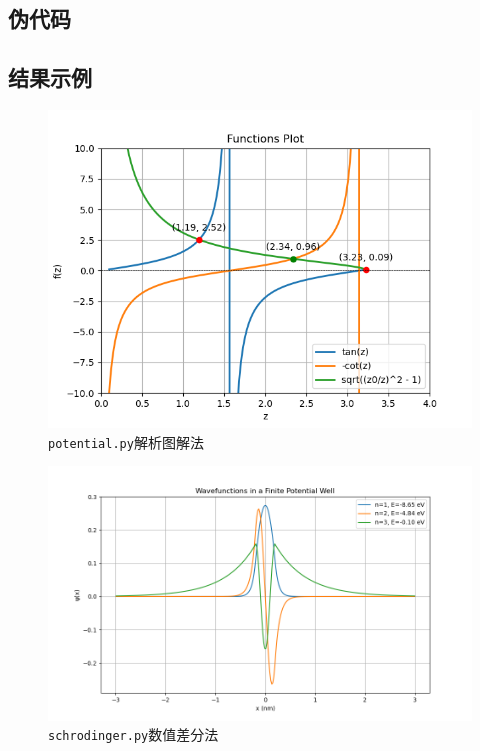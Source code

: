 \subsection{伪代码}


\subsection{结果示例}
\begin{figure}[H]
    \centering
    \includegraphics[width=1.0\textwidth]{Figs/3_fun.png}
    \caption{\texttt{potential.py}解析图解法}
    \label{fig:3_py_fun}
\end{figure}

\begin{figure}[H]
    \centering
    \includegraphics[width=1.0\textwidth]{Figs/3_diff.png}
    \caption{\texttt{schrodinger.py}数值差分法}
    \label{fig:3_py_diff}
\end{figure}